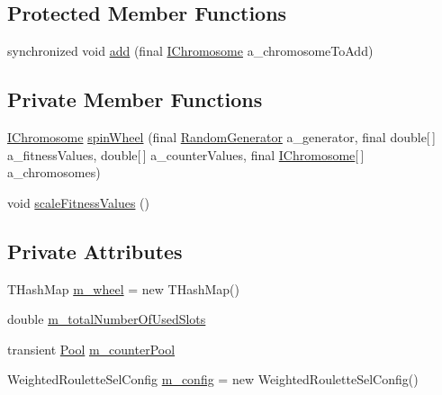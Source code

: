 \subsection*{Protected Member Functions}
\begin{DoxyCompactItemize}
\item 
synchronized void \hyperlink{classorg_1_1jgap_1_1impl_1_1_weighted_roulette_selector_a9159512255d11e69543387cd3a155a31}{add} (final \hyperlink{interfaceorg_1_1jgap_1_1_i_chromosome}{I\-Chromosome} a\-\_\-chromosome\-To\-Add)
\end{DoxyCompactItemize}
\subsection*{Private Member Functions}
\begin{DoxyCompactItemize}
\item 
\hyperlink{interfaceorg_1_1jgap_1_1_i_chromosome}{I\-Chromosome} \hyperlink{classorg_1_1jgap_1_1impl_1_1_weighted_roulette_selector_a7eabf165a70445ab131f7fcc6b4aa3fd}{spin\-Wheel} (final \hyperlink{interfaceorg_1_1jgap_1_1_random_generator}{Random\-Generator} a\-\_\-generator, final double\mbox{[}$\,$\mbox{]} a\-\_\-fitness\-Values, double\mbox{[}$\,$\mbox{]} a\-\_\-counter\-Values, final \hyperlink{interfaceorg_1_1jgap_1_1_i_chromosome}{I\-Chromosome}\mbox{[}$\,$\mbox{]} a\-\_\-chromosomes)
\item 
void \hyperlink{classorg_1_1jgap_1_1impl_1_1_weighted_roulette_selector_a8d866890cb4edf93557c733ebe426797}{scale\-Fitness\-Values} ()
\end{DoxyCompactItemize}
\subsection*{Private Attributes}
\begin{DoxyCompactItemize}
\item 
T\-Hash\-Map \hyperlink{classorg_1_1jgap_1_1impl_1_1_weighted_roulette_selector_aab723231155bb89882434f47f092a55a}{m\-\_\-wheel} = new T\-Hash\-Map()
\item 
double \hyperlink{classorg_1_1jgap_1_1impl_1_1_weighted_roulette_selector_a2e232452c43c7625bea03cb4799500d8}{m\-\_\-total\-Number\-Of\-Used\-Slots}
\item 
transient \hyperlink{classorg_1_1jgap_1_1impl_1_1_pool}{Pool} \hyperlink{classorg_1_1jgap_1_1impl_1_1_weighted_roulette_selector_ab3dc747b69b4d746dd6b0e1c8556dcdd}{m\-\_\-counter\-Pool}
\item 
Weighted\-Roulette\-Sel\-Config \hyperlink{classorg_1_1jgap_1_1impl_1_1_weighted_roulette_selector_af9b7d0d34b65bf6e6a3841f9956f9cb5}{m\-\_\-config} = new Weighted\-Roulette\-Sel\-Config()
\end{DoxyCompactItemize}
